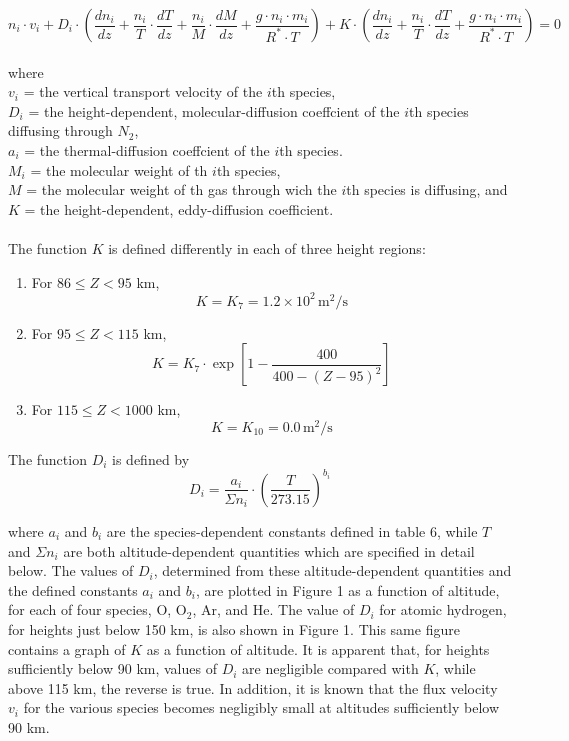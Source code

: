 \documentclass{article}
\begin{document}
\begin{equation}
  n_i \cdot v_i  + D_i \cdot \left ( \frac{dn_i}{dz} + \frac{n_i}{T} \cdot \frac{dT}{dz} + \frac{n_i}{M} \cdot \frac{dM}{dz}  + \frac{g \cdot n_i \cdot m_i}{R^* \cdot T}  \right ) + K \cdot \left ( \frac{dn_i}{dz} + \frac{n_i}{T} \cdot \frac{dT}{dz}  + \frac{g \cdot n_i \cdot m_i}{R^* \cdot T} \right ) = 0 \tag{6}
\end{equation}\\
where\\
$v_i$ = the vertical transport velocity of the $i$th species,\\
$D_i$ = the height-dependent, molecular-diffusion coeffcient of the $i$th species diffusing through $N_2$,\\
$a_i$ = the thermal-diffusion coeffcient of the $i$th species.\\
$M_i$ = the molecular weight of th $i$th species,\\
$M$ = the molecular weight of th gas through wich the $i$th species is diffusing, and\\
$K$ = the height-dependent, eddy-diffusion coefficient.\\
\\The function $K$ is defined differently in each of three height regions:\\
\begin{enumerate}
    \item For $86 \leq Z < 95$ km,
    \[
    K = K_7 = 1.2 \times 10^2 \, \text{m}^2/\text{s} \tag{7a}
    \]

    \item For $95 \leq Z < 115$ km,
    \[
    K = K_7 \cdot \exp\left[1 - \frac{400}{400 - (Z - 95)^2}\right] \tag{7b}
    \]

    \item For $115 \leq Z < 1000$ km,
    \[
    K = K_{10} = 0.0 \, \text{m}^2/\text{s} \tag{7c}
    \]
\end{enumerate}

The function $D_i$ is defined by
\[
D_i = \frac{a_i}{\Sigma n_i} \cdot \left(\frac{T}{273.15}\right)^{b_i} \tag{8}
\]

where $a_i$ and $b_i$ are the species-dependent constants defined in table 6, while $T$ and $\Sigma n_i$ are both altitude-dependent quantities which are specified in detail below. The values of $D_i$, determined from these altitude-dependent quantities and the defined constants $a_i$ and $b_i$, are plotted in Figure 1 as a function of altitude, for each of four species, O, O$_2$, Ar, and He. The value of $D_i$ for atomic hydrogen, for heights just below 150 km, is also shown in Figure 1. This same figure contains a graph of $K$ as a function of altitude. It is apparent that, for heights sufficiently below 90 km, values of $D_i$ are negligible compared with $K$, while above 115 km, the reverse is true. In addition, it is known that the flux velocity $v_i$ for the various species becomes negligibly small at altitudes sufficiently below 90 km.\\
\end{document}
